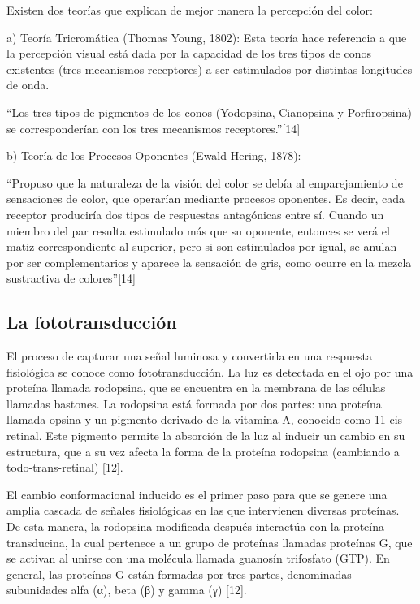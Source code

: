\documentclass[10pt]{article}
\begin{document}
\setlength{\parskip}{2mm}

Existen dos teorías que explican de mejor manera la percepción del color:

a)	Teoría Tricromática (Thomas Young, 1802):
 Esta teoría hace referencia a que la  percepción visual está dada por la capacidad de los tres tipos de conos existentes (tres mecanismos receptores) a ser estimulados por distintas longitudes de onda. 
 
\setlength{\parskip}{2mm} 
 
“Los tres tipos de pigmentos de los conos (Yodopsina, Cianopsina y Porfiropsina) se corresponderían con los tres mecanismos receptores.”[14]

\setlength{\parskip}{2mm}

b) Teoría de los Procesos Oponentes (Ewald Hering, 1878):
 
“Propuso que la naturaleza de la visión del color se debía al emparejamiento de sensaciones de color, que operarían mediante procesos oponentes. Es decir, cada receptor produciría dos tipos de respuestas antagónicas entre sí. Cuando un miembro del par resulta estimulado más que su oponente, entonces se verá el matiz correspondiente al superior, pero si son estimulados por igual, se anulan por ser complementarios y aparece la sensación de gris, como ocurre en la mezcla sustractiva de colores”[14]

\subsection{La fototransducción}

El proceso de capturar una señal luminosa y convertirla en una respuesta fisiológica se conoce como fototransducción. La luz es detectada en el ojo por una proteína llamada rodopsina, que se encuentra en la membrana de las células llamadas bastones. La rodopsina está formada por dos partes: una proteína llamada opsina y un pigmento derivado de la vitamina A, conocido como 11-cis-retinal. Este pigmento permite la absorción de la luz al inducir un cambio en su estructura, que a su vez afecta la forma de la proteína rodopsina (cambiando a todo-trans-retinal) [12].

\setlength{\parskip}{2mm}

El cambio conformacional inducido es el primer paso para que se genere una amplia cascada de señales fisiológicas en las que intervienen diversas proteínas. De esta manera, la rodopsina modificada después interactúa con la proteína transducina, la cual pertenece a un grupo de proteínas llamadas proteínas G, que se activan al unirse con una molécula llamada guanosín trifosfato (GTP). En general, las proteínas G están formadas por tres partes, denominadas subunidades alfa (α), beta (β) y gamma (γ) [12]. 
\end{document}
